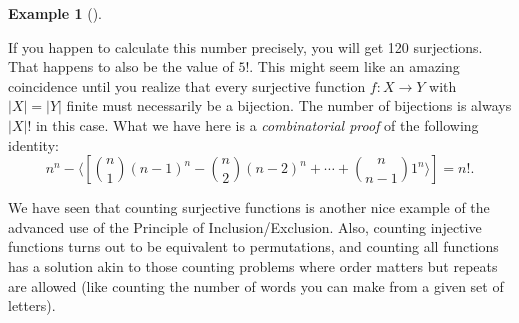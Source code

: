 \documentclass[10pt,]{book}
\theoremstyle{plain}
\theoremstyle{definition}
\newtheorem{example}[theorem]{Example}
\theoremstyle{definition}
\theoremstyle{definition}
\numberwithin{equation}{chapter}
\newcommand{\card}[1]{\left| #1 \right|}
\begin{document}
\begin{example}[]
\begin{enumerate}
      If you happen to calculate this number precisely, you will get 120 surjections.  That happens to also be the value of \(5!\).  This might seem like an amazing coincidence until you realize that every surjective function \(f:X \to Y\) with \(\card{X} = \card{Y}\) finite must necessarily be a bijection.  The number of bijections is always \(\card{X}!\) in this case.  What we have here is a \emph{combinatorial proof} of the following identity:
      \begin{equation*}
        n^n - \langle[{n\choose 1}(n-1)^n - {n \choose 2}(n-2)^n + \cdots + {n \choose n-1}1^n \rangle] = n!.
      \end{equation*}
\end{enumerate}
\end{example}
\par

    We have seen that counting surjective functions is another nice example of the advanced use of the Principle of Inclusion/Exclusion. Also, counting injective functions turns out to be equivalent to permutations, and counting all functions has a solution akin to those counting problems where order matters but repeats are allowed (like counting the number of words you can make from a given set of letters).
\par
\end{document}

